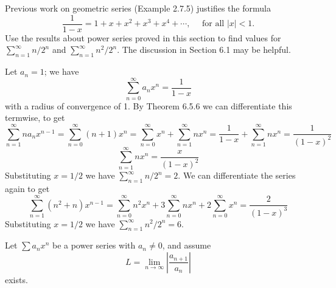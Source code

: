 \begin{exercise}
Previous work on geometric series (Example 2.7.5) justifies the formula
$$
\frac{1}{1-x}=1+x+x^{2}+x^{3}+x^{4}+\cdots, \quad \text { for all }|x|<1 .
$$
Use the results about power series proved in this section to find values for $\sum_{n=1}^{\infty} n / 2^{n}$ and $\sum_{n=1}^{\infty} n^{2} / 2^{n}$. The discussion in Section 6.1 may be helpful.
\end{exercise}
\begin{solution}
    Let \(a_n = 1\); we have
    \[\sum^\infty_{n=0}a_n x^n = \frac{1}{1-x}\]
    with a radius of convergence of 1. By Theorem 6.5.6 we can differentiate this termwise, to get
    \[\sum^\infty_{n=1} n a_n x^{n-1} = \sum^\infty_{n=0} (n+1) x^n = \sum^\infty_{n=0} x^n + \sum^\infty_{n=1}nx^n = \frac{1}{1-x} + \sum^\infty_{n=1}nx^n = \frac{1}{(1-x)^2}\]
    \[\sum^\infty_{n=1} nx^n= \frac{x}{(1-x)^2}\]
    Substituting \(x=1/2\) we have \(\sum^\infty_{n=1}n/2^n = 2\). We can differentiate the series again to get
    \[\sum^\infty_{n=1}(n^2 + n) x^{n-1} = \sum^\infty_{n=0} n^2x^n + 3\sum^\infty_{n=0}nx^n + 2\sum^\infty_{n=0} x^n = \frac{2}{(1-x)^3}\]
    Substituting \(x =1/2\) we have \(\sum^\infty_{n=1}n^2/2^n = 6\).
\end{solution}

\begin{exercise}
Let $\sum a_{n} x^{n}$ be a power series with $a_{n} \neq 0$, and assume
$$
L=\lim _{n \rightarrow \infty}\left|\frac{a_{n+1}}{a_{n}}\right|
$$
exists.

\end{exercise}

